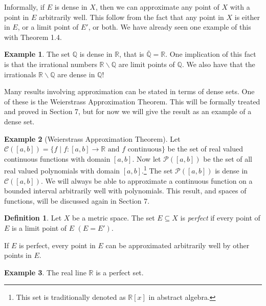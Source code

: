 \documentclass{article}
\newcommand{\R}{\mathbb{R}}
\newcommand{\Q}{\mathbb{Q}}
\theoremstyle{definition}
\newtheorem{definition}{Definition}[section]
\newtheorem{example}{Example}[section]
\begin{document}
Informally, if $ E $ is dense in $ X $, then we can approximate any point of $ X $ with a point in $ E $ arbitrarily well. This follow from the fact that any point in $ X $ is either in $ E $, or a limit point of $ E' $, or both.  We have already seen one example of this with Theorem 1.4.
\begin{example}
	The set $ \Q $ is dense in $ \R $, that is $ \bar{\Q}=\R $. One implication of this fact is that the irrational numbers $ \R\backslash\Q $ are limit points of $ \Q $. We also have that the irrationals $ \R\backslash\Q $ are dense in $ \Q $!
\end{example}
Many results involving approximation can be stated in terms of dense sets. One of these is the Weierstrass Approximation Theorem. This will be formally treated and proved in Section 7, but for now we will give the result as an example of a dense set.
\begin{example}[Weierstrass Approximation Theorem]
	Let $ \mathscr{C}([a,b])=\{f\mid f:[a,b]\to \R\text{ and } f\text{ continuous}\} $ be the set of real valued continuous functions with domain $ [a,b] $. Now let $ \mathscr{P}([a,b]) $ be the set of all real valued polynomials with domain $ [a,b] $.\footnote{This set is traditionally denoted as $ \R[x] $ in abstract algebra.} The set $ \mathscr{P}([a,b])  $ is dense in $ \mathscr{C}([a,b]) $. We will always be able to approximate a continuous function on a bounded interval arbitrarily well with polynomials. This result, and spaces of functions, will be discussed again in Section 7. 
\end{example}
\begin{definition}
	Let $ X $ be a metric space. The set $ E\subseteq X $ is \textit{\color{red}perfect} if every point of $ E $ is a limit point of $ E $ $ (E=E') $. 
\end{definition}
If $ E $ is perfect, every point in $ E $ can be approximated arbitrarily well by other points in $ E $. 
\begin{example}
	The real line $ \R $ is a perfect set. 
\end{example}
\end{document}
